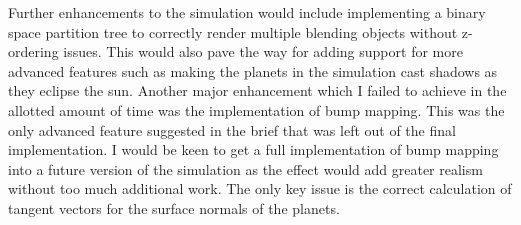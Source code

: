 \documentclass[conference]{IEEEtran}
\begin{document}
Further enhancements to the simulation would include implementing a binary space partition tree to correctly render multiple blending objects without z-ordering issues. This would also pave the way for adding support for more advanced features such as making the planets in the simulation cast shadows as they eclipse the sun. Another major enhancement which I failed to achieve in the allotted amount of time was the implementation of bump mapping. This was the only advanced feature suggested in the brief that was left out of the final implementation. I would be keen to get a full implementation of bump mapping into a future version of the simulation as the effect would add greater realism without too much additional work. The only key issue is the correct calculation of tangent vectors for the surface normals of the planets.



\end{document}
